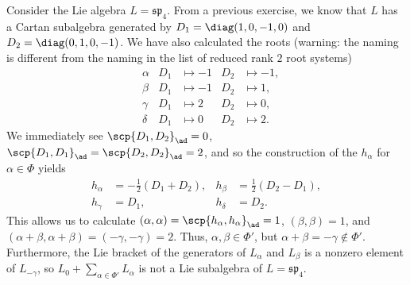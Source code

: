 Consider the Lie algebra $L = \mathfrak{sp}_4$. From a previous exercise, we know
that $L$ has a Cartan subalgebra generated by $D_1 = \diag(1, 0, -1, 0)$ and
$D_2 = \diag(0, 1, 0, -1)$. We have also calculated the roots (warning:
the naming is different from the naming in the list of reduced rank $2$ root
systems)
\begin{align*}
	&\alpha & D_1&\mapsto -1 & D_2&\mapsto -1,\\
	&\beta & D_1&\mapsto -1 & D_2&\mapsto 1,\\
	&\gamma & D_1&\mapsto 2 & D_2&\mapsto 0,\\
	&\delta & D_1&\mapsto 0 & D_2&\mapsto 2.
\end{align*}
We immediately see $\scp{D_1, D_2}_{\ad} = 0$, $\scp{D_1, D_1}_{\ad} = \scp{D_2, D_2}_{\ad} = 2$,
and so the construction of the $h_\alpha$ for $\alpha \in \Phi$ yields
\begin{align*}
	h_\alpha &= -\frac{1}{2}(D_1 + D_2), & h_\beta &= \frac{1}{2}(D_2 - D_1),\\
	h_\gamma &= D_1, & h_\delta &= D_2.
\end{align*}
This allows us to calculate $(\alpha, \alpha) = \scp{h_\alpha, h_\alpha}_{\ad} = 1$,
 $(\beta, \beta) = 1$, and $(\alpha + \beta, \alpha + \beta) = (-\gamma, -\gamma) = 2$.
Thus, $\alpha, \beta \in \Phi'$, but $\alpha + \beta = -\gamma \notin \Phi'$. Furthermore,
the Lie bracket of the generators of $L_\alpha$ and $L_\beta$ is a nonzero element
of $L_{-\gamma}$, so $L_0 + \sum_{\alpha \in \Phi'} L_\alpha$ is not a
Lie subalgebra of $L = \mathfrak{sp}_4$.
